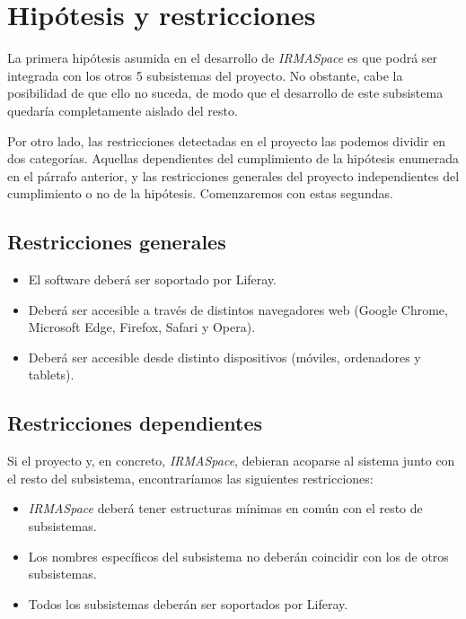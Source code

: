 \chapter{Hipótesis y restricciones}\label{sec:constaints}

\par La primera hipótesis asumida en el desarrollo de \textit{IRMASpace} es que podrá ser integrada con los otros 5 subsistemas del proyecto. No obstante, cabe la posibilidad de que ello no suceda, de modo que el desarrollo de este subsistema quedaría completamente aislado del resto.

\par Por otro lado, las restricciones detectadas en el proyecto las podemos dividir en dos categorías. Aquellas dependientes del cumplimiento de la hipótesis enumerada en el párrafo anterior, y las restricciones generales del proyecto independientes del cumplimiento o no de la hipótesis. Comenzaremos con estas segundas.

\section{Restricciones generales}
\begin{itemize}
    \item El software deberá ser soportado por Liferay.
    \item Deberá ser accesible a través de distintos navegadores web (Google Chrome, Microsoft Edge, Firefox, Safari y Opera).
    \item Deberá ser accesible desde distinto dispositivos (móviles, ordenadores y tablets).
\end{itemize}

\section{Restricciones dependientes}
\par Si el proyecto y, en concreto, \textit{IRMASpace}, debieran acoparse al sistema junto con el resto del subsistema, encontraríamos las siguientes restricciones:
\begin{itemize}
    \item \textit{IRMASpace} deberá tener estructuras mínimas en común con el resto de subsistemas.
    \item Los nombres específicos del subsistema no deberán coincidir con los de otros subsistemas.
    \item Todos los subsistemas deberán ser soportados por Liferay.
\end{itemize}
